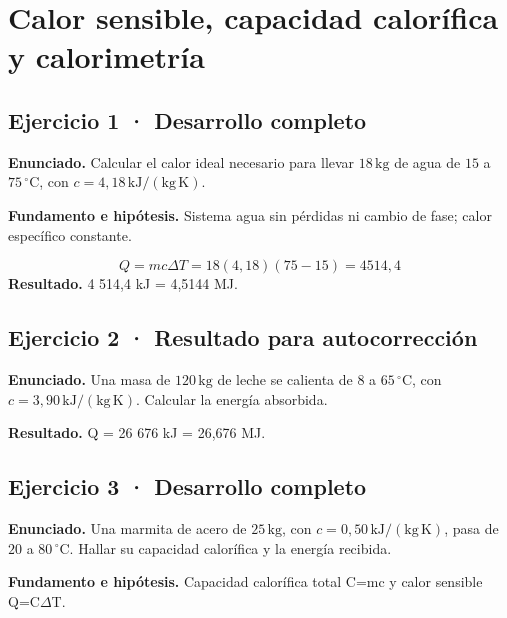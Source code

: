 \documentclass[11pt,a4paper]{article}
\begin{document}
\clearpage

\section{Calor sensible, capacidad calorífica y calorimetría}

\begin{center}\end{center}

\subsection*{Ejercicio 1 · Desarrollo completo}
\textbf{Enunciado.} Calcular el calor ideal necesario para llevar \(18\,\mathrm{kg}\) de agua de \(15\) a \(75\,^\circ\mathrm C\), con \(c=4{,}18\,\mathrm{kJ/(kg\,K)}\).

\textbf{Fundamento e hipótesis.} Sistema agua sin pérdidas ni cambio de fase; calor específico constante.

\[
Q=mc\Delta T=18(4{,}18)(75-15)=4514{,}4
\]
\textbf{Resultado.} 4 514,4 kJ = 4,5144 MJ.


\subsection*{Ejercicio 2 · Resultado para autocorrección}
\textbf{Enunciado.} Una masa de \(120\,\mathrm{kg}\) de leche se calienta de \(8\) a \(65\,^\circ\mathrm C\), con \(c=3{,}90\,\mathrm{kJ/(kg\,K)}\). Calcular la energía absorbida.

\textbf{Resultado.} Q = 26 676 kJ = 26,676 MJ.


\subsection*{Ejercicio 3 · Desarrollo completo}
\textbf{Enunciado.} Una marmita de acero de \(25\,\mathrm{kg}\), con \(c=0{,}50\,\mathrm{kJ/(kg\,K)}\), pasa de \(20\) a \(80\,^\circ\mathrm C\). Hallar su capacidad calorífica y la energía recibida.

\textbf{Fundamento e hipótesis.} Capacidad calorífica total C=mc y calor sensible Q=C\ensuremath{\Delta}T.
\end{document}
